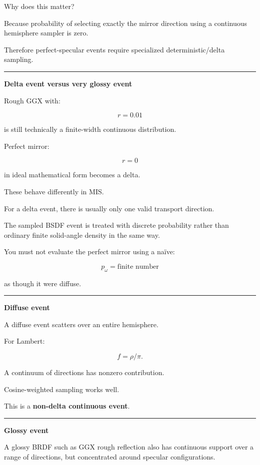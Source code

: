Why does this matter?

Because probability of selecting exactly the mirror direction using a continuous hemisphere sampler is zero.

Therefore perfect-specular events require specialized deterministic/delta sampling.

\begin{center}\rule{0.5\linewidth}{0.5pt}\end{center}

\textbf{Delta event versus very glossy event}

Rough GGX with:

\[
r=0.01
\]

is still technically a finite-width continuous distribution.

Perfect mirror:

\[
r=0
\]

in ideal mathematical form becomes a delta.

These behave differently in MIS.

For a delta event, there is usually only one valid transport direction.

The sampled BSDF event is treated with discrete probability rather than ordinary finite solid-angle density in the same way.

You must not evaluate the perfect mirror using a naïve:

\[
p_\omega=\text{finite number}
\]

as though it were diffuse.

\begin{center}\rule{0.5\linewidth}{0.5pt}\end{center}

\textbf{Diffuse event}

A diffuse event scatters over an entire hemisphere.

For Lambert:

\[
f=\rho/\pi.
\]

A continuum of directions has nonzero contribution.

Cosine-weighted sampling works well.

This is a \textbf{non-delta continuous event}.

\begin{center}\rule{0.5\linewidth}{0.5pt}\end{center}

\textbf{Glossy event}

A glossy BRDF such as GGX rough reflection also has continuous support over a range of directions, but concentrated around specular configurations.

